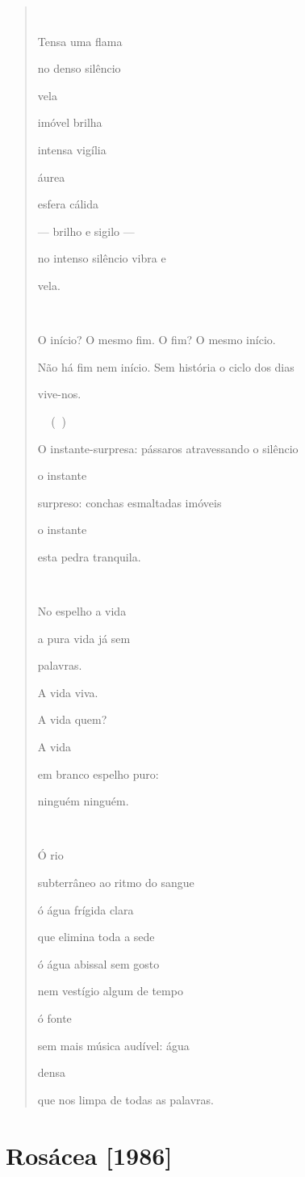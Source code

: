 \begin{quote}


Tensa uma flama

no denso silêncio

vela

imóvel brilha

intensa vigília

áurea

esfera cálida

--- brilho e sigilo ---

no intenso silêncio vibra e

vela.



O início? O mesmo fim. O fim? O mesmo início.

Não há fim nem início. Sem história o ciclo dos dias

vive-nos.

 ()

O instante-surpresa: pássaros atravessando o silêncio

o instante

surpreso: conchas esmaltadas imóveis

o instante

esta pedra tranquila.



No espelho a vida

a pura vida já sem

palavras.

A vida viva.

A vida quem?

A vida

em branco espelho puro:

ninguém ninguém.



Ó rio

subterrâneo ao ritmo do sangue

ó água frígida clara

que elimina toda a sede

ó água abissal sem gosto

nem vestígio algum de tempo

ó fonte

sem mais música audível: água

densa

que nos limpa de todas as palavras.
\end{quote}

\section{Rosácea {[}1986{]}}\label{rosuxe1cea}

